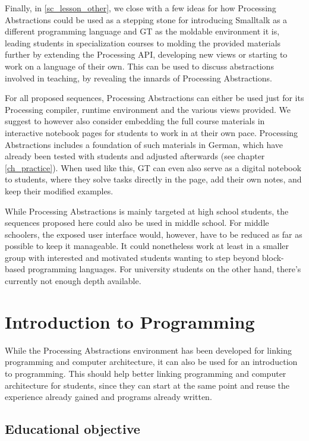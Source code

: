 Finally, in \ref{sc_lesson_other}, we close with a few ideas for how Processing Abstractions could be used as a stepping stone for introducing Smalltalk as a different programming language and \ac{GT} as the moldable environment it is, leading students in specialization courses to molding the provided materials further by \eg extending the Processing \ac{API}, developing new views or starting to work on a language of their own. This can be used to discuss abstractions involved in teaching, by revealing the innards of Processing Abstractions.

For all proposed sequences, Processing Abstractions can either be used just for its Processing compiler, runtime environment and the various views provided. We suggest to however also consider embedding the full course materials in interactive notebook pages for students to work in at their own pace. Processing Abstractions includes a foundation of such materials in German, which have already been tested with students and adjusted afterwards (see chapter \ref{ch_practice}). When used like this, \ac{GT} can even also serve as a digital notebook to students, where they solve tasks directly in the page, add their own notes, and keep their modified examples.

While Processing Abstractions is mainly targeted at high school students, the sequences proposed here could also be used in middle school. For middle schoolers, the exposed user interface would, however, have to be reduced as far as possible to keep it manageable. It could nonetheless work at least in a smaller group with interested and motivated students wanting to step beyond block-based programming languages. For university students on the other hand, there's currently not enough depth available.



\section{Introduction to Programming} \label{sc_lesson_intro}

While the Processing Abstractions environment has been developed for linking programming and computer architecture, it can also be used for an introduction to programming. This should help better linking programming and computer architecture for students, since they can start at the same point and reuse the experience already gained and programs already written.


\subsection{Educational objective}

